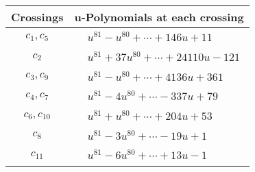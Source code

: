 \documentclass[1p]{elsarticle_modified}
\theoremstyle{definition}
\begin{document}
\begin{tabular}{m{50pt}|m{274pt}}
Crossings & \hspace{64pt}u-Polynomials at each crossing \\
\hline $$\begin{aligned}c_{1},c_{5}\end{aligned}$$&$\begin{aligned}
&u^{81}- u^{80}+\cdots+146 u+11
\end{aligned}$\\
\hline $$\begin{aligned}c_{2}\end{aligned}$$&$\begin{aligned}
&u^{81}+37 u^{80}+\cdots+24110 u-121
\end{aligned}$\\
\hline $$\begin{aligned}c_{3},c_{9}\end{aligned}$$&$\begin{aligned}
&u^{81}- u^{80}+\cdots+4136 u+361
\end{aligned}$\\
\hline $$\begin{aligned}c_{4},c_{7}\end{aligned}$$&$\begin{aligned}
&u^{81}-4 u^{80}+\cdots-337 u+79
\end{aligned}$\\
\hline $$\begin{aligned}c_{6},c_{10}\end{aligned}$$&$\begin{aligned}
&u^{81}+u^{80}+\cdots+204 u+53
\end{aligned}$\\
\hline $$\begin{aligned}c_{8}\end{aligned}$$&$\begin{aligned}
&u^{81}-3 u^{80}+\cdots-19 u+1
\end{aligned}$\\
\hline $$\begin{aligned}c_{11}\end{aligned}$$&$\begin{aligned}
&u^{81}-6 u^{80}+\cdots+13 u-1
\end{aligned}$\\
\hline
\end{tabular}\\~\\
\newpage\renewcommand{\arraystretch}{1}
\end{document}
